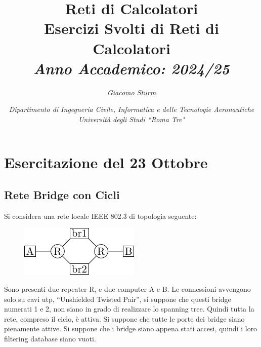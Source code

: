 \documentclass{article}
\numberwithin{equation}{subsection}
\begin{document}
\title{%
    \textbf{Reti di Calcolatori}  \\ 
    \large Esercizi Svolti di Reti di Calcolatori \\
    \textit{Anno Accademico: 2024/25}}
\author{\textit{Giacomo Sturm}}
\date{\textit{Dipartimento di Ingegneria Civile, Informatica e delle Tecnologie Aeronautiche \\
Università degli Studi ``Roma Tre"}}

\maketitle
\thispagestyle{link}

\clearpage


\pagestyle{fancy}
\fancyhead{}\fancyfoot{}
\fancyfoot[C]{\thepage}

\tableofcontents

\clearpage
{}

\section{Esercitazione del 23 Ottobre}

\subsection{Rete Bridge con Cicli}

Si considera una rete locale IEEE 802.3 di topologia seguente:

\begin{figure}[H]%
    \centering%
    \includegraphics[scale=1.25]{rete_bridge_cicli.pdf}%
\end{figure}

Sono presenti due repeater R, e due computer A e B. Le connessioni avvengono solo su cavi utp, ``Unshielded Twisted Pair'', si suppone che questi 
bridge numerati 1 e 2, non siano in grado di realizzare lo spanning tree. Quindi tutta la rete, compreso il ciclo, è attiva. Si suppone che tutte 
le porte dei bridge siano pienamente attive. 
Si suppone che i bridge siano appena stati accesi, quindi i loro filtering database siano vuoti. 
\end{document}
